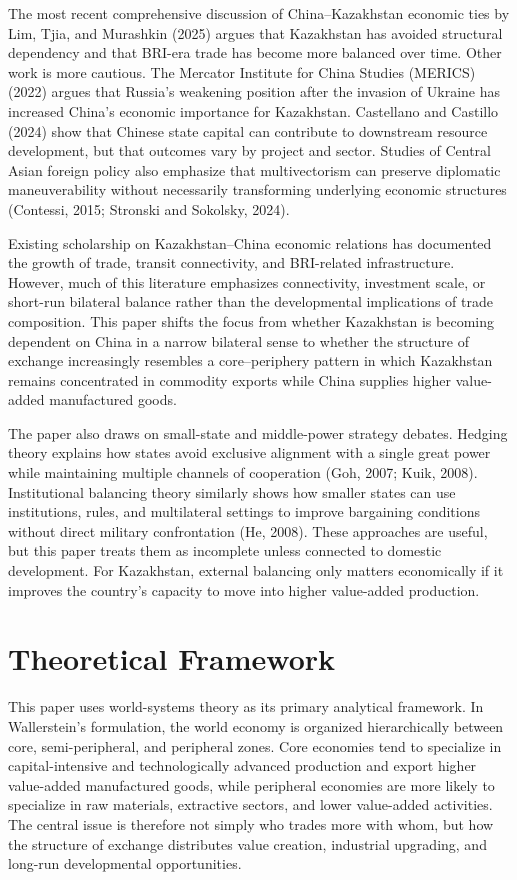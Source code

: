 \documentclass[12pt]{article}
\begin{document}
The most recent comprehensive discussion of China--Kazakhstan economic ties by Lim, Tjia, and Murashkin (2025) argues that Kazakhstan has avoided structural dependency and that BRI-era trade has become more balanced over time. Other work is more cautious. The Mercator Institute for China Studies (MERICS) (2022) argues that Russia's weakening position after the invasion of Ukraine has increased China's economic importance for Kazakhstan. Castellano and Castillo (2024) show that Chinese state capital can contribute to downstream resource development, but that outcomes vary by project and sector. Studies of Central Asian foreign policy also emphasize that multivectorism can preserve diplomatic maneuverability without necessarily transforming underlying economic structures (Contessi, 2015; Stronski and Sokolsky, 2024).

Existing scholarship on Kazakhstan--China economic relations has documented the growth of trade, transit connectivity, and BRI-related infrastructure. However, much of this literature emphasizes connectivity, investment scale, or short-run bilateral balance rather than the developmental implications of trade composition. This paper shifts the focus from whether Kazakhstan is becoming dependent on China in a narrow bilateral sense to whether the structure of exchange increasingly resembles a core--periphery pattern in which Kazakhstan remains concentrated in commodity exports while China supplies higher value-added manufactured goods.

The paper also draws on small-state and middle-power strategy debates. Hedging theory explains how states avoid exclusive alignment with a single great power while maintaining multiple channels of cooperation (Goh, 2007; Kuik, 2008). Institutional balancing theory similarly shows how smaller states can use institutions, rules, and multilateral settings to improve bargaining conditions without direct military confrontation (He, 2008). These approaches are useful, but this paper treats them as incomplete unless connected to domestic development. For Kazakhstan, external balancing only matters economically if it improves the country's capacity to move into higher value-added production.

\section{Theoretical Framework}

This paper uses world-systems theory as its primary analytical framework. In Wallerstein's formulation, the world economy is organized hierarchically between core, semi-peripheral, and peripheral zones. Core economies tend to specialize in capital-intensive and technologically advanced production and export higher value-added manufactured goods, while peripheral economies are more likely to specialize in raw materials, extractive sectors, and lower value-added activities. The central issue is therefore not simply who trades more with whom, but how the structure of exchange distributes value creation, industrial upgrading, and long-run developmental opportunities.
\end{document}
